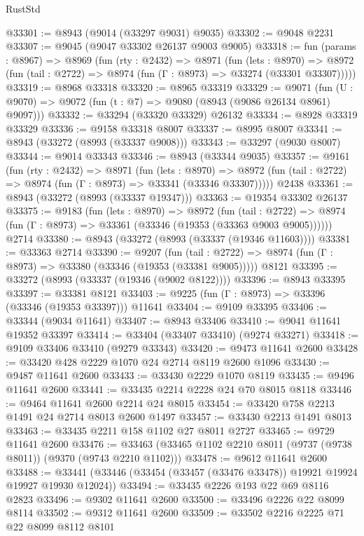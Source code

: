 \begin{lexlean}{RustStd}
\begin{coremodule}
{\begin{coremodule}
{{{{{{{{{{{{{{{{{{{{{{{{{{{{{{{{{{{{{{{@33301 := @8943 (@9014 (@33297 @9031) @9035)
@33302 := @9048 @2231
@33307 := @9045 (@9047 @33302 @26137 @9003 @9005)
@33318 := fun (params : @8967) =>
  @8969
    (fun (rty : @2432) =>
    @8971
      (fun (lets : @8970) =>
      @8972 (fun (tail : @2722) => @8974 (fun (Γ : @8973) => @33274 (@33301 @33307)))))
@33319 := @8968 @33318
@33320 := @8965 @33319
@33329 := @9071
    (fun (U : @9070) => @9072 (fun (t : @7) => @9080 (@8943 (@9086 @26134 @8961) @9097)))
@33332 := @33294 (@33320 @33329) @26132
@33334 := @8928 @33319 @33329
@33336 := @9158 @33318 @8007
@33337 := @8995 @8007
@33341 := @8943 (@33272 (@8993 (@33337 @9008)))
@33343 := @33297 (@9030 @8007)
@33344 := @9014 @33343
@33346 := @8943 (@33344 @9035)
@33357 := @9161
    (fun (rty : @2432) =>
    @8971
      (fun (lets : @8970) =>
      @8972 (fun (tail : @2722) => @8974 (fun (Γ : @8973) => @33341 (@33346 @33307)))))
    @2438
@33361 := @8943 (@33272 (@8993 (@33337 @19347)))
@33363 := @19354 @33302 @26137
@33375 := @9183
    (fun (lets : @8970) =>
    @8972
      (fun (tail : @2722) =>
      @8974 (fun (Γ : @8973) => @33361 (@33346 (@19353 (@33363 @9003 @9005))))))
    @2714
@33380 := @8943 (@33272 (@8993 (@33337 (@19346 @11603))))
@33381 := @33363 @2714
@33390 := @9207
    (fun (tail : @2722) => @8974 (fun (Γ : @8973) => @33380 (@33346 (@19353 (@33381 @9005)))))
    @8121
@33395 := @33272 (@8993 (@33337 (@19346 (@9002 @8122))))
@33396 := @8943 @33395
@33397 := @33381 @8121
@33403 := @9225 (fun (Γ : @8973) => @33396 (@33346 (@19353 @33397))) @11641
@33404 := @9109 @33395
@33406 := @33344 (@9034 @11641)
@33407 := @8943 @33406
@33410 := @9041 @11641 @19352 @33397
@33414 := @33404 (@33407 @33410) (@9274 @33271)
@33418 := @9109 @33406 @33410 (@9279 @33343)
@33420 := @9473 @11641 @2600
@33428 := @33420 @428 @2229 @1070 @24 @2714 @8119 @2600 @1096
@33430 := @9487 @11641 @2600
@33433 := @33430 @2229 @1070 @8119
@33435 := @9496 @11641 @2600
@33441 := @33435 @2214 @2228 @24 @70 @8015 @8118
@33446 := @9464 @11641 @2600 @2214 @24 @8015
@33454 := @33420 @758 @2213 @1491 @24 @2714 @8013 @2600 @1497
@33457 := @33430 @2213 @1491 @8013
@33463 := @33435 @2211 @158 @1102 @27 @8011 @2727
@33465 := @9729 @11641 @2600
@33476 := @33463 (@33465 @1102 @2210 @8011 (@9737 (@9738 @8011)) (@9370 (@9743 @2210 @1102)))
@33478 := @9612 @11641 @2600
@33488 := @33441 (@33446 (@33454 (@33457 (@33476 @33478)) @19921 @19924 @19927 @19930 @12024))
@33494 := @33435 @2226 @193 @22 @69 @8116 @2823
@33496 := @9302 @11641 @2600
@33500 := @33496 @2226 @22 @8099 @8114
@33502 := @9312 @11641 @2600
@33509 := @33502 @2216 @2225 @71 @22 @8099 @8112 @8101
}}}}}}}}}}}}}}}}}}}}}}}}}}}}}}}}}}}}}}}
\end{coremodule}}
\end{coremodule}
\end{lexlean}
